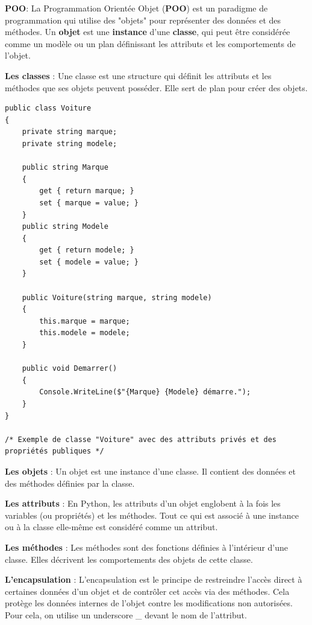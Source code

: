 \noindent \textbf{POO}:
\noindent La Programmation Orientée Objet (\textbf{POO}) est un paradigme de programmation qui utilise des "objets" pour représenter des données et des méthodes. Un \textbf{objet} est une \textbf{instance} d'une \textbf{classe}, qui peut être considérée comme un modèle ou un plan définissant les attributs et les comportements de l'objet.

\vspace{0.5cm}

\noindent \textbf{Les classes} : Une classe est une structure qui définit les attributs et les méthodes que ses objets peuvent posséder. Elle sert de plan pour créer des objets.
\begin{verbatim}
public class Voiture
{
	private string marque;
	private string modele;

	public string Marque 
	{ 
		get { return marque; } 
		set { marque = value; } 
	}
	public string Modele 
	{ 
		get { return modele; } 
		set { modele = value; } 
	}

	public Voiture(string marque, string modele)
	{
		this.marque = marque;
		this.modele = modele;
	}

	public void Demarrer()
	{
		Console.WriteLine($"{Marque} {Modele} démarre.");
	}
}

/* Exemple de classe "Voiture" avec des attributs privés et des
propriétés publiques */
\end{verbatim}

\newpage

\noindent \textbf{Les objets} : Un objet est une instance d'une classe. Il contient des données et des méthodes définies par la classe.

\vspace{0.5cm}

\noindent \textbf{Les attributs} : En Python, les attributs d’un objet englobent à la fois les variables (ou propriétés) et les méthodes. Tout ce qui est associé à une instance ou à la classe elle-même est considéré comme un attribut.

\vspace{0.5cm}

\noindent \textbf{Les méthodes} : Les méthodes sont des fonctions définies à l'intérieur d'une classe. Elles décrivent les comportements des objets de cette classe.

\vspace{0.5cm}

\noindent \textbf{L'encapsulation} : L'encapsulation est le principe de restreindre l'accès direct à certaines données d'un objet et de contrôler cet accès via des méthodes. Cela protège les données internes de l'objet contre les modifications non autorisées. Pour cela, on utilise un underscore \_ devant le nom de l'attribut.


